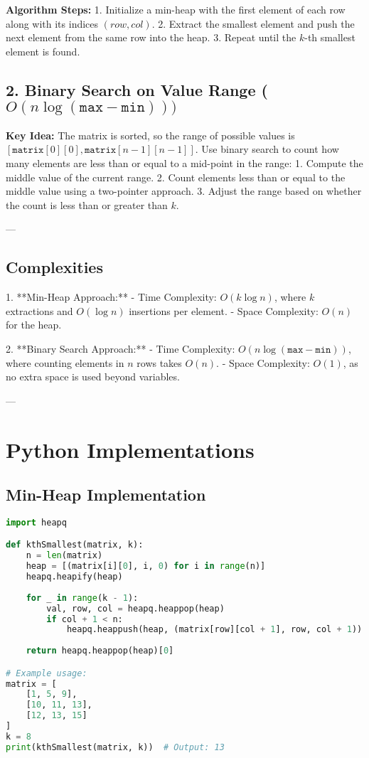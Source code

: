 \textbf{Algorithm Steps:}
1. Initialize a min-heap with the first element of each row along with its indices \((row, col)\).
2. Extract the smallest element and push the next element from the same row into the heap.
3. Repeat until the \(k\)-th smallest element is found.

\subsection*{2. Binary Search on Value Range (\(O(n \log(\texttt{max} - \texttt{min})))\)}
\textbf{Key Idea:}
The matrix is sorted, so the range of possible values is \([\texttt{matrix}[0][0], \texttt{matrix}[n-1][n-1]]\). Use binary search to count how many elements are less than or equal to a mid-point in the range:
1. Compute the middle value of the current range.
2. Count elements less than or equal to the middle value using a two-pointer approach.
3. Adjust the range based on whether the count is less than or greater than \(k\).

---

\subsection*{Complexities}
1. **Min-Heap Approach:**
   - Time Complexity: \(O(k \log n)\), where \(k\) extractions and \(O(\log n)\) insertions per element.
   - Space Complexity: \(O(n)\) for the heap.

2. **Binary Search Approach:**
   - Time Complexity: \(O(n \log(\texttt{max} - \texttt{min}))\), where counting elements in \(n\) rows takes \(O(n)\).
   - Space Complexity: \(O(1)\), as no extra space is used beyond variables.

---

\section*{Python Implementations}

\subsection*{Min-Heap Implementation}
\begin{fullwidth}
\begin{lstlisting}[language=Python]
import heapq

def kthSmallest(matrix, k):
    n = len(matrix)
    heap = [(matrix[i][0], i, 0) for i in range(n)]
    heapq.heapify(heap)
    
    for _ in range(k - 1):
        val, row, col = heapq.heappop(heap)
        if col + 1 < n:
            heapq.heappush(heap, (matrix[row][col + 1], row, col + 1))
    
    return heapq.heappop(heap)[0]

# Example usage:
matrix = [
    [1, 5, 9],
    [10, 11, 13],
    [12, 13, 15]
]
k = 8
print(kthSmallest(matrix, k))  # Output: 13
\end{lstlisting}
\end{fullwidth}

